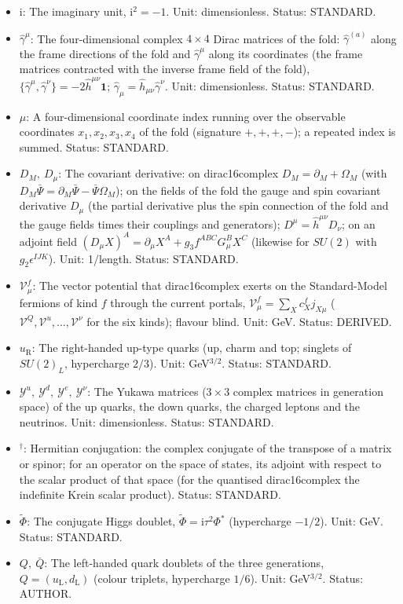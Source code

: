 \documentclass[
  10pt,
]{article}
\providecommand{\tightlist}{%
  \setlength{\itemsep}{0pt}\setlength{\parskip}{0pt}}
\begin{document}
\begin{itemize}
\tightlist
\item
  \(\mathrm{i}\): The imaginary unit, \(\mathrm{i}^2 = -1\). Unit:
  dimensionless. Status: STANDARD.
\item
  \(\hat\gamma^\mu\): The four-dimensional complex \(4 \times 4\) Dirac
  matrices of the fold: \(\hat\gamma^{(a)}\) along the frame directions
  of the fold and \(\hat\gamma^\mu\) along its coordinates (the frame
  matrices contracted with the inverse frame field of the fold),
  \(\{\hat\gamma^\mu, \hat\gamma^\nu\} = -2\hat h^{\mu\nu}\mathbf{1}\);
  \(\hat\gamma_\mu = \hat h_{\mu\nu}\hat\gamma^\nu\). Unit:
  dimensionless. Status: STANDARD.
\item
  \(\mu\): A four-dimensional coordinate index running over the
  observable coordinates \(x_1, x_2, x_3, x_4\) of the fold (signature
  \(+,+,+,-\)); a repeated index is summed. Status: STANDARD.
\item
  \(D_M,\ D_\mu\): The covariant derivative: on dirac16complex
  \(D_M = \partial_M + \Omega_M\) (with
  \(D_M\bar\Psi = \partial_M\bar\Psi - \bar\Psi\Omega_M\)); on the
  fields of the fold the gauge and spin covariant derivative \(D_\mu\)
  (the partial derivative plus the spin connection of the fold and the
  gauge fields times their couplings and generators);
  \(D^\mu = \hat h^{\mu\nu}D_\nu\); on an adjoint field
  \((D_\mu X)^A = \partial_\mu X^A + g_3f^{ABC}G^B_\mu X^C\) (likewise
  for \(SU(2)\) with \(g_2\epsilon^{IJK}\)). Unit: 1/length. Status:
  STANDARD.
\item
  \(\mathcal{V}^{f}_\mu\): The vector potential that dirac16complex
  exerts on the Standard-Model fermions of kind \(f\) through the
  current portals, \(\mathcal{V}^{f}_\mu = \sum_Xc^{f}_Xj_{X\mu}\)
  (\(\mathcal{V}^{Q}, \mathcal{V}^{u}, \dots, \mathcal{V}^{\nu}\) for
  the six kinds); flavour blind. Unit: GeV. Status: DERIVED.
\item
  \(u_{\mathrm{R}}\): The right-handed up-type quarks (up, charm and
  top; singlets of \(SU(2)_L\), hypercharge \(2/3\)). Unit:
  GeV\(^{3/2}\). Status: STANDARD.
\item
  \(\mathcal{Y}^{u},\ \mathcal{Y}^{d},\ \mathcal{Y}^{e},\ \mathcal{Y}^{\nu}\):
  The Yukawa matrices (\(3 \times 3\) complex matrices in generation
  space) of the up quarks, the down quarks, the charged leptons and the
  neutrinos. Unit: dimensionless. Status: STANDARD.
\item
  \({}^\dagger\): Hermitian conjugation: the complex conjugate of the
  transpose of a matrix or spinor; for an operator on the space of
  states, its adjoint with respect to the scalar product of that space
  (for the quantised dirac16complex the indefinite Krein scalar
  product). Status: STANDARD.
\item
  \(\tilde\Phi\): The conjugate Higgs doublet,
  \(\tilde\Phi = \mathrm{i}\tau^2\Phi^*\) (hypercharge \(-1/2\)). Unit:
  GeV. Status: STANDARD.
\item
  \(Q,\ \bar Q\): The left-handed quark doublets of the three
  generations, \(Q = (u_{\mathrm{L}}, d_{\mathrm{L}})\) (colour
  triplets, hypercharge \(1/6\)). Unit: GeV\(^{3/2}\). Status: AUTHOR.
\end{itemize}
\end{document}
